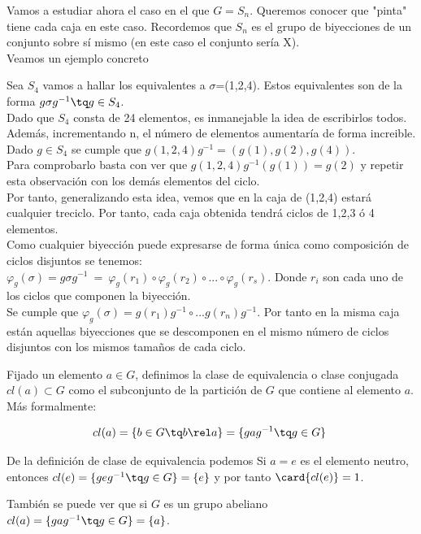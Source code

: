 \documentclass[nochap]{apuntes}
\begin{document}
Vamos a estudiar ahora el caso en el que $G=S_{n}$. Queremos conocer que "pinta" tiene cada caja en este caso. Recordemos que 
$S_{n}$  es el grupo de biyecciones de un conjunto sobre sí mismo (en este caso el conjunto sería X).\\
Veamos un ejemplo concreto
\begin{example}
 Sea $S_{4}$  vamos a hallar los equivalentes a $\sigma$=(1,2,4). Estos equivalentes son de la forma $g\sigma g^{-1} \tq g \in S_{4}$.\\
 Dado que $S_{4}$  consta de 24 elementos, es inmanejable la idea de escribirlos todos. Además, incrementando n, el número de elementos
 aumentaría de forma increible.\\
 Dado $g\in S_{4}$  se cumple que $g(1,2,4)g^{-1}=(g(1),g(2),g(4))$.\\
 Para comprobarlo basta con ver que $g(1,2,4)g^{-1}(g(1))=g(2)$  y repetir esta observación con los demás elementos del ciclo.\\
 Por tanto, generalizando esta idea, vemos que en la caja de (1,2,4) estará cualquier treciclo. Por tanto, cada caja obtenida tendrá
 ciclos de 1,2,3 ó 4 elementos.\\
 Como cualquier biyección puede expresarse de forma única como composición de ciclos disjuntos se tenemos:\\
 $\varphi_{g}(\sigma)=g\sigma g^{-1}\ = \ \varphi_{g}(r_{1}) \circ \varphi_{g}(r_{2}) \circ ... \circ \varphi_{g}(r_{s})$. Donde $r_{i}$  son cada uno de los
 ciclos que componen la biyección.\\
 Se cumple que $\varphi_{g}(\sigma)=g(r_{1})g^{-1} \circ ... g(r_{n})g^{-1}$.  Por tanto en la misma caja están aquellas biyecciones que se descomponen
 en el mismo número de ciclos disjuntos con los mismos tamaños de cada ciclo.
\end{example}

\begin{defn}
Fijado un elemento $a\in G$, definimos la clase de equivalencia o clase conjugada $cl(a) \subset G$ como el subconjunto de la partición de $G$ que contiene al elemento $a$. Más formalmente:

\[ cl(a) = \{ b \in G \tq b\rel a \} = \{ gag^{-1} \tq g \in G \} \]
\end{defn}

\begin{remark} De la definición de clase de equivalencia podemos Si $a = e$ es el elemento neutro, entonces $cl(e) = \{ geg^{-1} \tq g\in G\} = \{ e\} $ y por tanto $\card{cl(e)} = 1$. 

También se puede ver que si $G$ es un grupo abeliano $cl(a) = \{ gag^{-1} \tq g \in G\} = \{ a \}$.
\end{remark}
\end{document}
